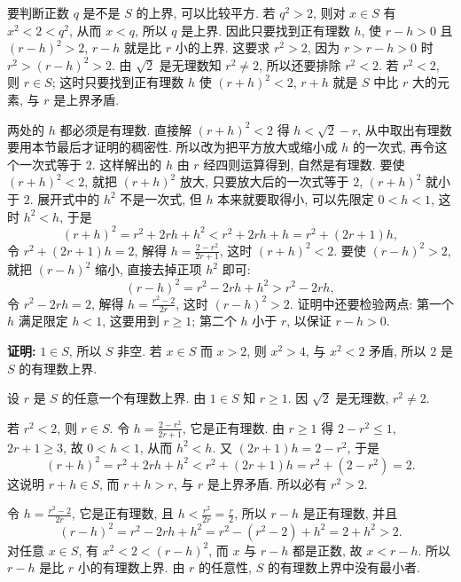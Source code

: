 \documentclass[UTF8,openany]{ctexbook}
\theoremstyle{chinesetextbook}
\newenvironment{cnproof}{\par\indent\textbf{证明:} \ignorespaces}{\par}
\begin{document}
要判断正数 $q$ 是不是 $S$ 的上界, 可以比较平方. 若 $q^2>2$, 则对 $x\in S$ 有 $x^2<2<q^2$, 从而 $x<q$, 所以 $q$ 是上界. 因此只要找到正有理数 $h$, 使 $r-h>0$ 且 $(r-h)^2>2$, $r-h$ 就是比 $r$ 小的上界. 这要求 $r^2>2$, 因为 $r>r-h>0$ 时 $r^2>(r-h)^2>2$. 由 $\sqrt2$ 是无理数知 $r^2\ne2$, 所以还要排除 $r^2<2$. 若 $r^2<2$, 则 $r\in S$; 这时只要找到正有理数 $h$ 使 $(r+h)^2<2$, $r+h$ 就是 $S$ 中比 $r$ 大的元素, 与 $r$ 是上界矛盾.

两处的 $h$ 都必须是有理数. 直接解 $(r+h)^2<2$ 得 $h<\sqrt2-r$, 从中取出有理数要用本节最后才证明的稠密性. 所以改为把平方放大或缩小成 $h$ 的一次式, 再令这个一次式等于 $2$. 这样解出的 $h$ 由 $r$ 经四则运算得到, 自然是有理数. 要使 $(r+h)^2<2$, 就把 $(r+h)^2$ 放大, 只要放大后的一次式等于 $2$, $(r+h)^2$ 就小于 $2$. 展开式中的 $h^2$ 不是一次式, 但 $h$ 本来就要取得小, 可以先限定 $0<h<1$, 这时 $h^2<h$, 于是
\[
(r+h)^2=r^2+2rh+h^2<r^2+2rh+h=r^2+(2r+1)h,
\]
令 $r^2+(2r+1)h=2$, 解得 $\displaystyle h=\frac{2-r^2}{2r+1}$, 这时 $(r+h)^2<2$. 要使 $(r-h)^2>2$, 就把 $(r-h)^2$ 缩小, 直接去掉正项 $h^2$ 即可:
\[
(r-h)^2=r^2-2rh+h^2>r^2-2rh,
\]
令 $r^2-2rh=2$, 解得 $\displaystyle h=\frac{r^2-2}{2r}$, 这时 $(r-h)^2>2$. 证明中还要检验两点: 第一个 $h$ 满足限定 $h<1$, 这要用到 $r\ge1$; 第二个 $h$ 小于 $r$, 以保证 $r-h>0$.
\begin{cnproof}
$1\in S$, 所以 $S$ 非空. 若 $x\in S$ 而 $x>2$, 则 $x^2>4$, 与 $x^2<2$ 矛盾, 所以 $2$ 是 $S$ 的有理数上界.

设 $r$ 是 $S$ 的任意一个有理数上界. 由 $1\in S$ 知 $r\ge1$. 因 $\sqrt2$ 是无理数, $r^2\ne2$.

若 $r^2<2$, 则 $r\in S$. 令 $\displaystyle h=\frac{2-r^2}{2r+1}$, 它是正有理数. 由 $r\ge1$ 得 $2-r^2\le1$, $2r+1\ge3$, 故 $0<h<1$, 从而 $h^2<h$. 又 $(2r+1)h=2-r^2$, 于是
\[
(r+h)^2=r^2+2rh+h^2<r^2+(2r+1)h=r^2+(2-r^2)=2.
\]
这说明 $r+h\in S$, 而 $r+h>r$, 与 $r$ 是上界矛盾. 所以必有 $r^2>2$.

令 $\displaystyle h=\frac{r^2-2}{2r}$, 它是正有理数, 且 $\displaystyle h<\frac{r^2}{2r}=\frac r2$, 所以 $r-h$ 是正有理数, 并且
\[
(r-h)^2=r^2-2rh+h^2=r^2-(r^2-2)+h^2=2+h^2>2.
\]
对任意 $x\in S$, 有 $x^2<2<(r-h)^2$, 而 $x$ 与 $r-h$ 都是正数, 故 $x<r-h$. 所以 $r-h$ 是比 $r$ 小的有理数上界. 由 $r$ 的任意性, $S$ 的有理数上界中没有最小者.
\end{cnproof}
\end{document}
